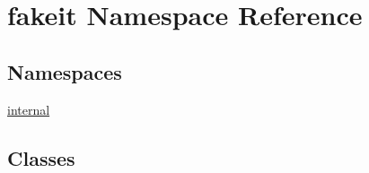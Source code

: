 \hypertarget{namespacefakeit}{}\section{fakeit Namespace Reference}
\label{namespacefakeit}
\subsection*{Namespaces}
\begin{DoxyCompactItemize}
\item 
 \mbox{\hyperlink{namespacefakeit_1_1internal}{internal}}
\end{DoxyCompactItemize}
\subsection*{Classes}
